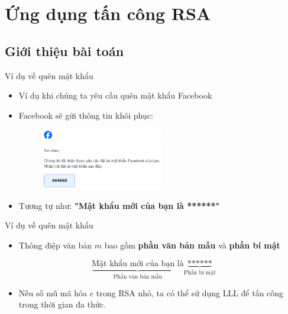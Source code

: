 \section{Ứng dụng tấn công RSA}

\subsection{Giới thiệu bài toán}

\begin{frame}{Ví dụ về quên mật khẩu}

\begin{itemize}
\item Ví dụ khi chúng ta yêu cầu quên mật khẩu Facebook
\item Facebook sẽ gửi thông tin khôi phục:

\begin{figure}[h]
\includegraphics[width=0.5\textwidth]{pictures/facebook.png}
\end{figure}

\item Tương tự như: \textbf{"Mật khẩu mới của bạn là ******"}
\end{itemize}

\end{frame}
\begin{frame}{Ví dụ về quên mật khẩu}

\begin{itemize}
\item Thông điệp văn bản \(m \) bao gồm \textbf{phần văn bản mẫu} và \textbf{phần bí mật}
\end{itemize}

$$
\underbrace{\text{Mật khẩu mới của bạn là}}_{\text{Phần văn bản mẫu}}
\underbrace{\text{******}}_{\text{Phần bí mật}}
$$

\begin{itemize}
\item Nếu số mũ mã hóa \(e \) trong RSA nhỏ, ta có thể sử dụng LLL để tấn công trong thời gian đa thức.
\end{itemize}

\end{frame}
